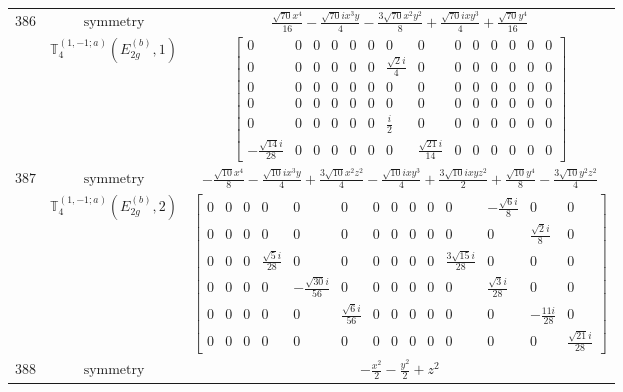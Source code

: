 \documentclass[fleqn,8pt,landscape]{jsarticle}
\begin{document}
\begin{longtable}{ccc}
$ 386 $ & $ \text{symmetry} $ & $ \frac{\sqrt{70} x^{4}}{16} - \frac{\sqrt{70} i x^{3} y}{4} - \frac{3 \sqrt{70} x^{2} y^{2}}{8} + \frac{\sqrt{70} i x y^{3}}{4} + \frac{\sqrt{70} y^{4}}{16} $ \\
$  $ & $ \mathbb{T}_{4}^{(1,-1;a)}(E_{2g}^{(b)},1) $ & $ \begin{bmatrix} 0 & 0 & 0 & 0 & 0 & 0 & 0 & 0 & 0 & 0 & 0 & 0 & 0 & 0 \\ 0 & 0 & 0 & 0 & 0 & 0 & \frac{\sqrt{2} i}{4} & 0 & 0 & 0 & 0 & 0 & 0 & 0 \\ 0 & 0 & 0 & 0 & 0 & 0 & 0 & 0 & 0 & 0 & 0 & 0 & 0 & 0 \\ 0 & 0 & 0 & 0 & 0 & 0 & 0 & 0 & 0 & 0 & 0 & 0 & 0 & 0 \\ 0 & 0 & 0 & 0 & 0 & 0 & \frac{i}{2} & 0 & 0 & 0 & 0 & 0 & 0 & 0 \\ - \frac{\sqrt{14} i}{28} & 0 & 0 & 0 & 0 & 0 & 0 & \frac{\sqrt{21} i}{14} & 0 & 0 & 0 & 0 & 0 & 0 \end{bmatrix} $ \\ \hline
$ 387 $ & $ \text{symmetry} $ & $ - \frac{\sqrt{10} x^{4}}{8} - \frac{\sqrt{10} i x^{3} y}{4} + \frac{3 \sqrt{10} x^{2} z^{2}}{4} - \frac{\sqrt{10} i x y^{3}}{4} + \frac{3 \sqrt{10} i x y z^{2}}{2} + \frac{\sqrt{10} y^{4}}{8} - \frac{3 \sqrt{10} y^{2} z^{2}}{4} $ \\
$  $ & $ \mathbb{T}_{4}^{(1,-1;a)}(E_{2g}^{(b)},2) $ & $ \begin{bmatrix} 0 & 0 & 0 & 0 & 0 & 0 & 0 & 0 & 0 & 0 & 0 & - \frac{\sqrt{6} i}{8} & 0 & 0 \\ 0 & 0 & 0 & 0 & 0 & 0 & 0 & 0 & 0 & 0 & 0 & 0 & \frac{\sqrt{2} i}{8} & 0 \\ 0 & 0 & 0 & \frac{\sqrt{5} i}{28} & 0 & 0 & 0 & 0 & 0 & 0 & \frac{3 \sqrt{15} i}{28} & 0 & 0 & 0 \\ 0 & 0 & 0 & 0 & - \frac{\sqrt{30} i}{56} & 0 & 0 & 0 & 0 & 0 & 0 & \frac{\sqrt{3} i}{28} & 0 & 0 \\ 0 & 0 & 0 & 0 & 0 & \frac{\sqrt{6} i}{56} & 0 & 0 & 0 & 0 & 0 & 0 & - \frac{11 i}{28} & 0 \\ 0 & 0 & 0 & 0 & 0 & 0 & 0 & 0 & 0 & 0 & 0 & 0 & 0 & \frac{\sqrt{21} i}{28} \end{bmatrix} $ \\ \hline
$ 388 $ & $ \text{symmetry} $ & $ - \frac{x^{2}}{2} - \frac{y^{2}}{2} + z^{2} $ \\

\end{longtable}
\end{document}
